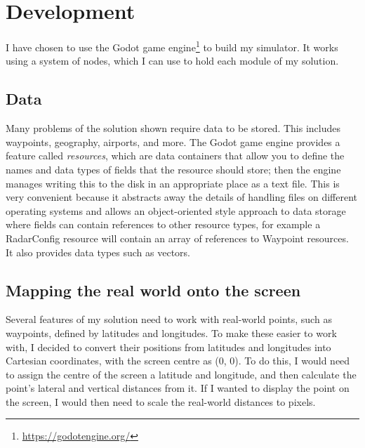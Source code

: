 \documentclass{article}
\begin{document}
\clearpage
\section{Development}
I have chosen to use the Godot game engine\footnote{\url{https://godotengine.org/}} to build my simulator.
It works using a system of nodes, which I can use to hold each module of my solution.


\subsection{Data}
Many problems of the solution shown require data to be stored.
This includes waypoints, geography, airports, and more.
The Godot game engine provides a feature called \textit{resources}, which are data containers that allow you to define the names and data types of fields that the resource should store; then the engine manages writing this to the disk in an appropriate place as a text file.
This is very convenient because it abstracts away the details of handling files on different operating systems and allows an object-oriented style approach to data storage where fields can contain references to other resource types, for example a RadarConfig resource will contain an array of references to Waypoint resources.
It also provides data types such as vectors.


\subsection{Mapping the real world onto the screen}
Several features of my solution need to work with real-world points, such as \glspl{waypoint}, defined by latitudes and longitudes.
To make these easier to work with, I decided to convert their positions from latitudes and longitudes into Cartesian coordinates, with the screen centre as (0, 0).
To do this, I would need to assign the centre of the screen a latitude and longitude, and then calculate the point's lateral and vertical distances from it.
If I wanted to display the point on the screen, I would then need to scale the real-world distances to pixels.
\end{document}
